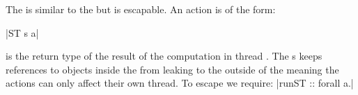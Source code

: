 \documentclass[thesis-solanki.tex]{subfiles}
\begin{document}

The  is similar to the  but is escapable.
An  action  is of the form:

|ST s a|

 is the return type of the result of the computation in thread .
The s keeps references to objects inside the  from leaking to the outside of the
 meaning the actions can only affect their own thread.
To escape we require:
|runST :: forall a.|
\end{document}
